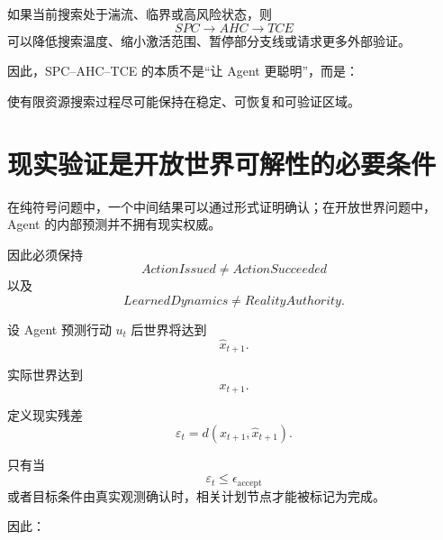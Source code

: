 如果当前搜索处于湍流、临界或高风险状态，则
\begin{equation}
SPC
\rightarrow
AHC
\rightarrow
TCE
\end{equation}
可以降低搜索温度、缩小激活范围、暂停部分支线或请求更多外部验证。

因此，SPC--AHC--TCE 的本质不是“让 Agent 更聪明”，而是：

\begin{statementbox}
使有限资源搜索过程尽可能保持在稳定、可恢复和可验证区域。
\end{statementbox}

\section{现实验证是开放世界可解性的必要条件}

在纯符号问题中，一个中间结果可以通过形式证明确认；在开放世界问题中，Agent 的内部预测并不拥有现实权威。

因此必须保持
\begin{equation}
\boxed{
ActionIssued
\neq
ActionSucceeded
}
\end{equation}
以及
\begin{equation}
\boxed{
LearnedDynamics
\neq
RealityAuthority.
}
\end{equation}

设 Agent 预测行动 $u_t$ 后世界将达到
\begin{equation}
\hat x_{t+1}.
\end{equation}

实际世界达到
\begin{equation}
x_{t+1}.
\end{equation}

定义现实残差
\begin{equation}
\varepsilon_t
=
d(
x_{t+1},
\hat x_{t+1}
).
\end{equation}

只有当
\begin{equation}
\varepsilon_t
\leq
\epsilon_{\mathrm{accept}}
\end{equation}
或者目标条件由真实观测确认时，相关计划节点才能被标记为完成。

因此：

\begin{statementbox}
\centering
{}
\end{statementbox}

